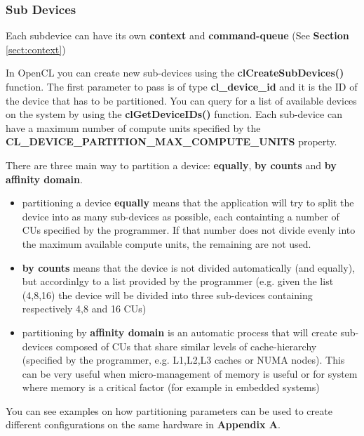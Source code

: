 \subsubsection{Sub Devices} \label{sect:DF-subdevices}
Each subdevice can have its own \textbf{context} and \textbf{command-queue} (See \textbf{Section} \ref{sect:context})

\begin{CLCode}
In OpenCL you can create new sub-devices using the \textbf{clCreateSubDevices()} function. The first parameter to pass is of type \textbf{cl\_device\_id} and it is the ID of the device that has to be partitioned. You can query for a list of available devices on the system by using the \textbf{clGetDeviceIDs()} function. Each sub-device can have a maximum number of compute units specified by the \textbf{CL\_DEVICE\_PARTITION\_MAX\_COMPUTE\_UNITS} property.
\label{Code:DevicePartitioning}
\end{CLCode}

There are three main way to partition a device: \textbf{equally}, \textbf{by counts} and \textbf{by affinity domain}.

\begin{itemize}
	\item partitioning a device \textbf{equally} means that the application will try to split the device into as many sub-devices as possible, each containting a number of CUs specified by the programmer. If that number does not divide evenly into the maximum available compute units, the remaining are not used.
	\item \textbf{by counts} means that the device is not divided automatically (and equally), but accordinlgy to a list provided by the programmer (e.g. given the list (4,8,16) the device will be divided into three sub-devices containing respectively 4,8 and 16 CUs)
	\item partitioning by \textbf{affinity domain} is an automatic process that will create sub-devices composed of CUs that share similar levels of cache-hierarchy (specified by the programmer, e.g. L1,L2,L3 caches or NUMA nodes). This can be very useful when micro-management of memory is useful or for system where memory is a critical factor (for example in  embedded systems)
\end{itemize}

You can see examples on how partitioning parameters can be used to create different configurations on the same hardware in \textbf{Appendix A}.






